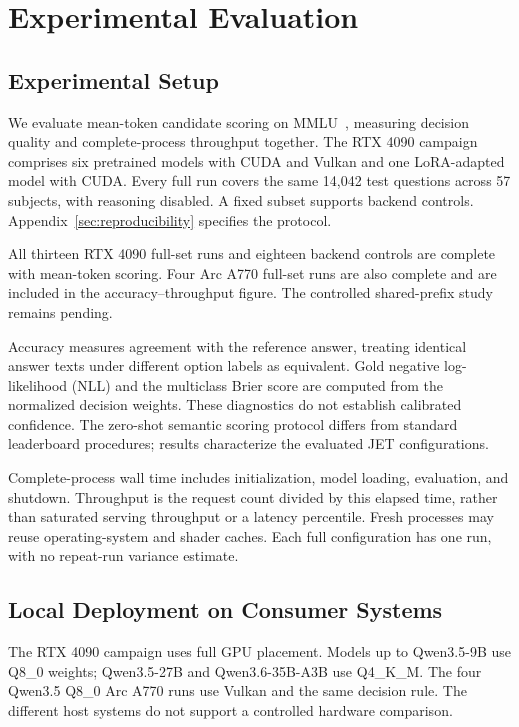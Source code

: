 \section{Experimental Evaluation}
\label{sec:evaluation}
\subsection{Experimental Setup}
We evaluate mean-token candidate scoring on MMLU~\cite{mmlu}, measuring
decision quality and complete-process throughput together. The RTX 4090
campaign comprises six pretrained models with CUDA and Vulkan and one
LoRA-adapted model with CUDA. Every full run covers the same 14,042 test
questions across 57 subjects, with reasoning disabled. A fixed subset supports
backend controls. Appendix~\ref{sec:reproducibility} specifies the protocol.

All thirteen RTX 4090 full-set runs and eighteen backend controls are complete
with mean-token scoring. Four Arc A770 full-set runs are also complete and are
included in the accuracy--throughput figure. The controlled shared-prefix
study remains pending.

Accuracy measures agreement with the reference answer, treating identical
answer texts under different option labels as equivalent. Gold negative
log-likelihood (NLL) and the multiclass Brier score are computed from the
normalized decision weights. These diagnostics do not establish calibrated
confidence. The zero-shot semantic scoring protocol differs from standard
leaderboard procedures; results characterize the evaluated JET configurations.

Complete-process wall time includes initialization, model loading, evaluation,
and shutdown. Throughput is the request count divided by this elapsed time,
rather than saturated serving throughput or a latency percentile. Fresh
processes may reuse operating-system and shader caches. Each full configuration
has one run, with no repeat-run variance estimate.

\subsection{Local Deployment on Consumer Systems}
\label{sec:local-deployment}
The RTX 4090 campaign uses full GPU placement. Models up to Qwen3.5-9B use
Q8\_0 weights; Qwen3.5-27B and Qwen3.6-35B-A3B use Q4\_K\_M. The four
Qwen3.5 Q8\_0 Arc A770 runs use Vulkan and the same decision rule. The
different host systems do not support a controlled hardware comparison.

